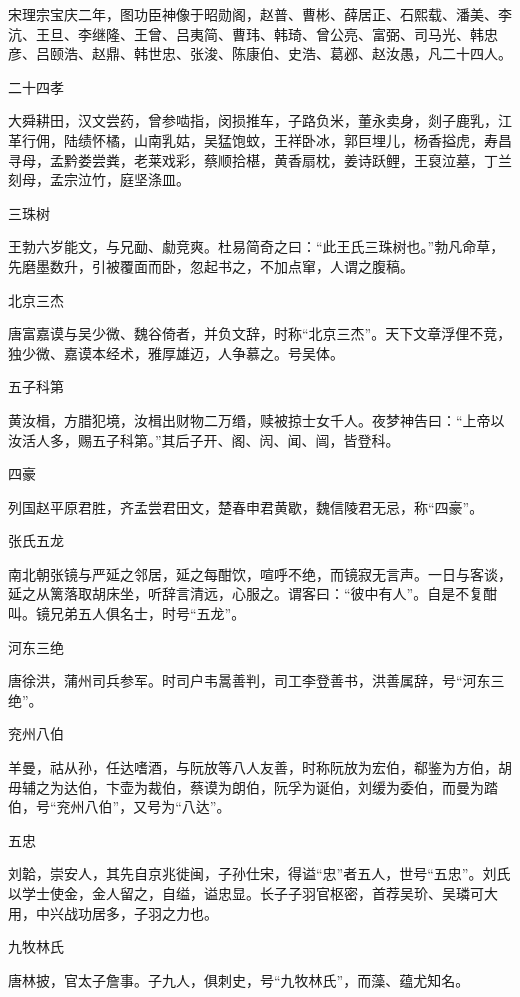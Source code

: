 \documentclass[a4paper,12pt,UTF8,twoside]{ctexbook}
\begin{document}
    宋理宗宝庆二年，图功臣神像于昭勋阁，赵普、曹彬、薛居正、石熙载、潘美、李沆、王旦、李继隆、王曾、吕夷简、曹玮、韩琦、曾公亮、富弼、司马光、韩忠彦、吕颐浩、赵鼎、韩世忠、张浚、陈康伯、史浩、葛邲、赵汝愚，凡二十四人。
    
    二十四孝
    
    大舜耕田，汉文尝药，曾参啮指，闵损推车，子路负米，董永卖身，剡子鹿乳，江革行佣，陆绩怀橘，山南乳姑，吴猛饱蚊，王祥卧冰，郭巨埋儿，杨香搤虎，寿昌寻母，孟黔娄尝粪，老莱戏彩，蔡顺拾椹，黄香扇枕，姜诗跃鲤，王裒泣墓，丁兰刻母，孟宗泣竹，庭坚涤皿。
    
    三珠树
    
    王勃六岁能文，与兄勔、勮竞爽。杜易简奇之曰：“此王氏三珠树也。”勃凡命草，先磨墨数升，引被覆面而卧，忽起书之，不加点窜，人谓之腹稿。
    
    北京三杰
    
    唐富嘉谟与吴少微、魏谷倚者，并负文辞，时称“北京三杰”。天下文章浮俚不竞，独少微、嘉谟本经术，雅厚雄迈，人争慕之。号吴体。
    
    五子科第
    
    黄汝楫，方腊犯境，汝楫出财物二万缗，赎被掠士女千人。夜梦神告曰：“上帝以汝活人多，赐五子科第。”其后子开、阁、闶、闻、闿，皆登科。
    
    四豪
    
    列国赵平原君胜，齐孟尝君田文，楚春申君黄歇，魏信陵君无忌，称“四豪”。
    
    张氏五龙
    
    南北朝张镜与严延之邻居，延之每酣饮，喧呼不绝，而镜寂无言声。一日与客谈，延之从篱落取胡床坐，听辞言清远，心服之。谓客曰：“彼中有人”。自是不复酣叫。镜兄弟五人俱名士，时号“五龙”。
    
    河东三绝
    
    唐徐洪，蒲州司兵参军。时司户韦暠善判，司工李登善书，洪善属辞，号“河东三绝”。
    
    兖州八伯
    
    羊曼，祜从孙，任达嗜酒，与阮放等八人友善，时称阮放为宏伯，郗鉴为方伯，胡毋辅之为达伯，卞壶为裁伯，蔡谟为朗伯，阮孚为诞伯，刘缓为委伯，而曼为踏伯，号“兖州八伯”，又号为“八达”。
    
    五忠
    
    刘韐，崇安人，其先自京兆徙闽，子孙仕宋，得谥“忠”者五人，世号“五忠”。刘氏以学士使金，金人留之，自缢，谥忠显。长子子羽官枢密，首荐吴玠、吴璘可大用，中兴战功居多，子羽之力也。
    
    九牧林氏
    
    唐林披，官太子詹事。子九人，俱刺史，号“九牧林氏”，而藻、蕴尤知名。
    
\end{document}
